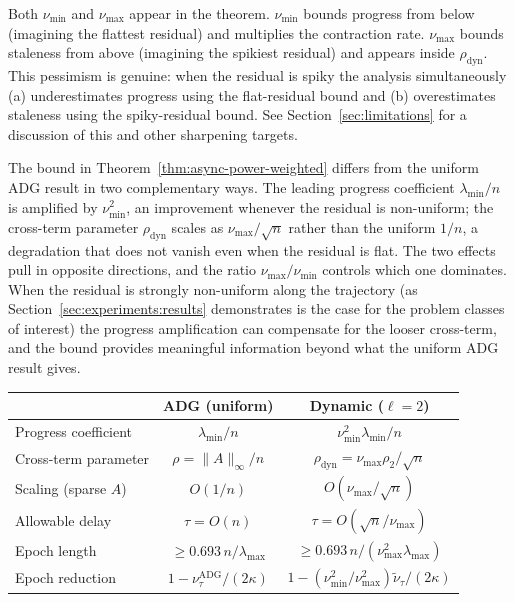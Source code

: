 \documentclass[pdflatex,sn-mathphys-num]{sn-jnl}%
\newcommand{\lmin}{\lambda_{\min}}
\newcommand{\lmax}{\lambda_{\max}}
\theoremstyle{thmstyleone}%
\theoremstyle{thmstyletwo}%
\theoremstyle{thmstylethree}%
\begin{document}
Both $\nu_{\min}$ and $\nu_{\max}$ appear in the theorem. $\nu_{\min}$
bounds progress from below (imagining the flattest residual) and
multiplies the contraction rate. $\nu_{\max}$ bounds staleness from
above (imagining the spikiest residual) and appears inside
$\rho_{\text{dyn}}$. This pessimism is genuine: when the residual is
spiky the analysis simultaneously (a) underestimates progress using the
flat-residual bound and (b) overestimates staleness using the spiky-residual
bound. See Section~\ref{sec:limitations} for a discussion of this and
other sharpening targets.

The bound in Theorem~\ref{thm:async-power-weighted} differs from the
uniform ADG result in two complementary ways. The leading progress
coefficient $\lmin/n$ is amplified by $\nu_{\min}^2$, an improvement
whenever the residual is non-uniform; the cross-term parameter
$\rho_{\text{dyn}}$ scales as $\nu_{\max}/\sqrt n$ rather than the
uniform $1/n$, a degradation that does not vanish even when the
residual is flat. The two effects pull in opposite directions, and the
ratio $\nu_{\max}/\nu_{\min}$ controls which one dominates. When the
residual is strongly non-uniform along the trajectory (as
Section~\ref{sec:experiments:results} demonstrates is the case for the
problem classes of interest) the progress amplification can
compensate for the looser cross-term, and the bound provides meaningful
information beyond what the uniform ADG result gives.


\begin{center}
\renewcommand{\arraystretch}{1.3}
\begin{tabular}{@{}lcc@{}}
\toprule
& \textbf{ADG (uniform)} & \textbf{Dynamic ($\ell=2$)} \\
\midrule
Progress coefficient         & $\lmin/n$                   & $\nu_{\min}^2 \lmin/n$ \\
Cross-term parameter         & $\rho = \|A\|_\infty/n$     & $\rho_{\text{dyn}} = \nu_{\max}\rho_2/\sqrt n$ \\
Scaling (sparse $A$)         & $O(1/n)$                    & $O(\nu_{\max}/\sqrt n)$ \\
Allowable delay              & $\tau = O(n)$               & $\tau = O(\sqrt n/\nu_{\max})$ \\
Epoch length                 & $\geq 0.693\,n/\lmax$       & $\geq 0.693\,n/(\nu_{\max}^2\lmax)$ \\
Epoch reduction              & $1 - \nu_\tau^{\mathrm{ADG}}/(2\kappa)$ & $1 - (\nu_{\min}^2/\nu_{\max}^2)\tilde\nu_\tau/(2\kappa)$ \\
\bottomrule
\end{tabular}
\end{center}
\end{document}

